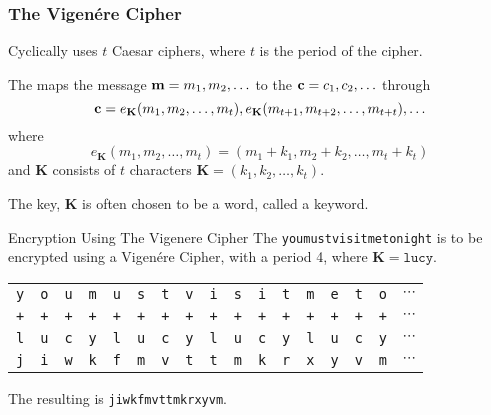 \subsubsection{The Vigen\'{e}re Cipher}\label{subsubsec:The_Vigenere_Cipher}
Cyclically uses $t$ Caesar ciphers, where $t$ is the period of the cipher.

The  maps the  message $\operatorname{\mathbf{m}} = m_{1},m_{2},\ldots$ to the  $\operatorname{\mathbf{c}} = c_{1},c_{2},\ldots$ through
\begin{equation}\label{eq:The_Vigenere_Cipher-Encryption}
  \operatorname{\mathbf{c}} = e_{\mathbf{K}} (m_{1}, m_{2}, \ldots, m_{t} ), e_{\mathbf{K}} (m_{t+1}, m_{t+2}, \ldots, m_{t+t}),\ldots
\end{equation}
where
\begin{equation*}
  e_{\mathbf{K}} (m_{1}, m_{2}, \ldots, m_{t}) = (m_{1}+k_{1}, m_{2}+k_{2}, \ldots, m_{t}+k_{t})
\end{equation*}
and $\mathbf{K}$ consists of $t$ characters $\mathbf{K} = (k_{1}, k_{2}, \ldots, k_{t})$.

\begin{remark*}
  The key, $\mathbf{K}$ is often chosen to be a word, called a keyword.
\end{remark*}

\begin{example}[Lecture 4]{Encryption Using The Vigenere Cipher}
  The  \texttt{youmustvisitmetonight} is to be encrypted using a Vigen\'{e}re Cipher, with a period 4, where $\mathbf{K} = \mathtt{lucy}$.
  \tcblower{}
  \begin{center}
    \begin{tabular}{cccc|cccc|cccc|cccc|c}
      \toprule
      \texttt{y} &  \texttt{o} &  \texttt{u} &  \texttt{m} &  \texttt{u} &  \texttt{s} &  \texttt{t} &  \texttt{v} &  \texttt{i} &  \texttt{s} &  \texttt{i} &  \texttt{t} &  \texttt{m} &  \texttt{e} &  \texttt{t} &  \texttt{o} &  $\cdots$ \\
      \texttt{+} &  \texttt{+} &  \texttt{+} &  \texttt{+} &  \texttt{+} &  \texttt{+} &  \texttt{+} &  \texttt{+} &  \texttt{+} &  \texttt{+} &  \texttt{+} &  \texttt{+} &  \texttt{+} &  \texttt{+} &  \texttt{+} &  \texttt{+} &  $\cdots$ \\
      \texttt{l} &  \texttt{u} &  \texttt{c} &  \texttt{y} &  \texttt{l} &  \texttt{u} &  \texttt{c} &  \texttt{y} &  \texttt{l} &  \texttt{u} &  \texttt{c} &  \texttt{y} &  \texttt{l} &  \texttt{u} &  \texttt{c} &  \texttt{y} &  $\cdots$ \\
      \midrule
      \texttt{j} &  \texttt{i} &  \texttt{w} &  \texttt{k} &  \texttt{f} &  \texttt{m} &  \texttt{v} &  \texttt{t} &  \texttt{t} &  \texttt{m} &  \texttt{k} &  \texttt{r} &  \texttt{x} &  \texttt{y} &  \texttt{v} &  \texttt{m} &  $\cdots$ \\
      \bottomrule
    \end{tabular}
  \end{center}

  The resulting  is \texttt{jiwkfmvttmkrxyvm}.
\end{example}


